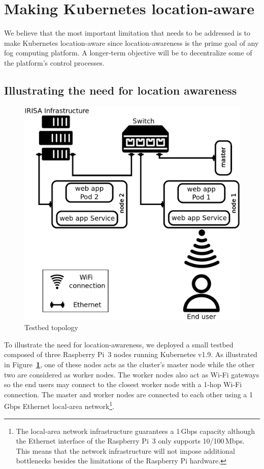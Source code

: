 \documentclass[letterpaper,twocolumn,10pt]{article}
\newcommand{\note}[1]{\noindent{\color{red}\textbf{#1}}}
\newcommand{\notegp}[1]{\note{\color{jazzberryjam}[\textsc{Guillaume:} #1]}}
\newcommand{\noteaf}[1]{\note{\color{ultramarine}[\textsc{Ali:} #1]}}
\let\origref\ref
\def\ref#1{\textbf{\origref{#1}}}
\begin{document}
\section{Making Kubernetes location-aware}\label{sec:road}

We believe that the most important limitation that needs to be
addressed is to make Kubernetes location-aware since location-awareness
is the prime goal of any fog computing platform. A longer-term
objective will be to decentralize some of the platform's control
processes.

\subsection{Illustrating the need for location awareness}

\begin{figure}[tbp]
  \centering
  \includegraphics[width=.9\linewidth]{images/clus.png}
  \caption{Testbed topology}
  \label{fig:clus}
\end{figure}


To illustrate the need for location-awareness, we deployed a small
testbed
composed of three Raspberry Pi~3 nodes running Kubernetes v1.9. As
illustrated in Figure~\ref{fig:clus}, one of these nodes acts as the
cluster's master node while the other two are considered as worker
nodes. The worker nodes also act as Wi-Fi gateways so the end users
may connect to the closest worker node with a 1-hop Wi-Fi
connection. The master and worker nodes are connected to each other
using a 1\,Gbps Ethernet local-area network\footnote{The local-area
  network infrastructure guarantees a 1\,Gbps capacity although the
  Ethernet interface of the Raspberry Pi~3 only supports
  10/100\,Mbps. This means that the network infrastructure will not
  impose additional bottlenecks besides the limitations of the
  Raspberry Pi hardware.}.
\end{document}
